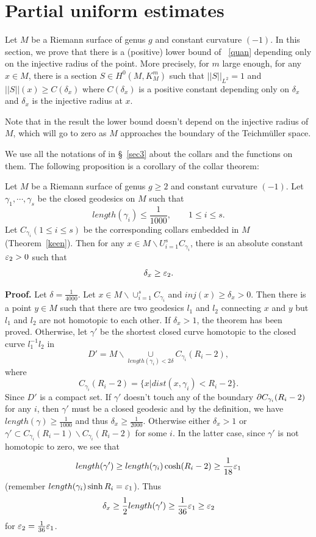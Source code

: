 \section{Partial uniform estimates}
Let
$M$ be a Riemann surface of genus $g$ and constant
 curvature $(-1)$.
In this section, we
prove that there is a (positive) lower bound of ~\eqref{quan} depending
only
on the injective radius of the point. More precisely,
for $m$ large 
enough, for any $x\in M$, there is a section $S\in H^0(M,K_M^m)$
such that $||S||_{L^2}=1$ and $||S||(x)\geq C(\delta_x)$
where $C(\delta_x)$ is a positive constant
depending only on $\delta_x$
 and $\delta_x$ is the
injective radius  at $x$.

Note that in the result the lower bound 
doesn't depend on the injective radius of $M$, which will go to zero as 
$M$ approaches the boundary of the Teichm\"uller space.

We  use all the notations of in \S ~\ref{sec3} about the
collars and the functions on them. The following proposition is a
corollary of the collar theorem:

\begin{prop}\label{prop31}
Let $M$ be a Riemann surface of genus $g\geq 2$ and constant
curvature $(-1)$. Let $\gamma_1,\cdots,\gamma_s$ be the closed geodesics
on $M$ such that
\[
length(\gamma_i)\leq\frac{1}{1000},\qquad
1\leq i\leq s.
\]
Let $C_{\gamma_i} (1\leq i\leq s)$ be the corresponding collars embedded
in
$M$ (Theorem~\ref{keen}). Then for any 
$x\in M\backslash U_{i=1}^s C_{\gamma_i}$,
there is an absolute constant $\varepsilon_2>0$ such that
\[
\delta_x\geq\varepsilon_2.
\]
\end{prop}


{\bf Proof.} 
 Let $\delta=\frac{1}{4000}$.
Let $x\in M\backslash\cup_{i=1}^sC_{\gamma_i}$ and $inj(x)\geq\delta_x>0$.
Then there
is a
point
$y\in M$
such that there are two geodesics $l_1$ and $l_2$
connecting $x$ and $y$ but $l_1$ and $l_2$ are not
homotopic to each other.
If $\delta_x>1$, the theorem has been proved. Otherwise, let $\gamma'$
be the shortest closed curve homotopic to the closed curve $l_1^{-1}l_2$
in
\[
D'=M\backslash\underset{length(\gamma_i)<2\delta}{\cup}
C_{\gamma_i}(R_i-2),
\]
where 
\[
C_{\gamma_i}(R_i-2)=\{
x| dist(x,\gamma_i)< R_i-2\}.
\]
Since
$D'$ is a compact set. If $\gamma'$ doesn't touch any of the
boundary $\partial C_{\gamma_i}(R_i-2)$ for any $i$, then $\gamma'$ must be a
closed
geodesic and by the definition, we have $length(\gamma)\geq
\frac{1}{1000}$ and
thus
$\delta_x\geq\frac{1}{2000}$. Otherwise either $\delta_x>1$ or
$\gamma'\subset
C_{\gamma_i}(R_i-1)\backslash C_{\gamma_i}(R_i-2)$ for some $i$. In the
latter
 case, since $\gamma'$ is not homotopic to zero,
we see  that
\[
length(\gamma')\geq length(\gamma_i) \cosh(R_i-2)\geq\frac {1}{18}\varepsilon_1
\]
(remember $length(\gamma_i)\sinh R_i=\varepsilon_1$).
Thus
\[
\delta_x\geq\frac 12 length(\gamma')\geq \frac{1}{36}\varepsilon_1\geq\varepsilon_2
\]
for $\varepsilon_2=\frac{1}{36}\varepsilon_1$.

